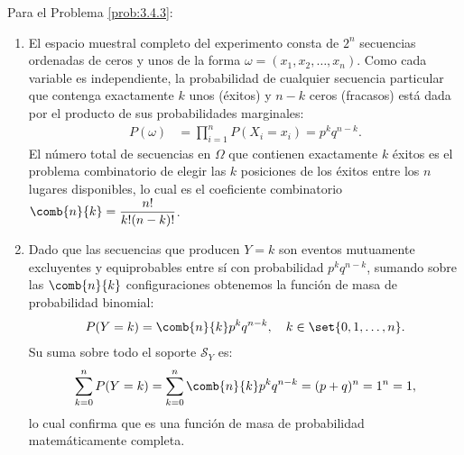 \begin{solucion}
	\label{sol:3.4.3}
	Para el Problema \ref{prob:3.4.3}:
	\begin{enumerate}
		\item El espacio muestral completo del experimento consta de $2^n$ secuencias ordenadas de ceros y unos de la forma $\omega = (x_1, x_2, \dots, x_n)$. Como cada variable es independiente, la probabilidad de cualquier secuencia particular que contenga exactamente $k$ unos (éxitos) y $n-k$ ceros (fracasos) está dada por el producto de sus probabilidades marginales:
		\begin{align*}
			P(\omega) &= \prod_{i=1}^n P(X_i = x_i) = p^k q^{n-k}.
		\end{align*}
		El número total de secuencias en $\Omega$ que contienen exactamente $k$ éxitos es el problema combinatorio de elegir las $k$ posiciones de los éxitos entre los $n$ lugares disponibles, lo cual es el coeficiente combinatorio $\comb{n}{k} = \dfrac{n!}{k!(n-k)!}$.
		\item Dado que las secuencias que producen $Y=k$ son eventos mutuamente excluyentes y equiprobables entre sí con probabilidad $p^k q^{n-k}$, sumando sobre las $\comb{n}{k}$ configuraciones obtenemos la función de masa de probabilidad binomial:
		\begin{align*}
			P(Y = k) = \comb{n}{k} p^k q^{n-k}, \quad k \in \set{0, 1, \dots, n}.
		\end{align*}
		Su suma sobre todo el soporte $\mathcal{S}_Y$ es:
		\begin{align*}
			\sum_{k=0}^n P(Y = k) = \sum_{k=0}^n \comb{n}{k} p^k q^{n-k} = (p + q)^n = 1^n = 1,
		\end{align*}
		lo cual confirma que es una función de masa de probabilidad matemáticamente completa.
	\end{enumerate}
\end{solucion}

